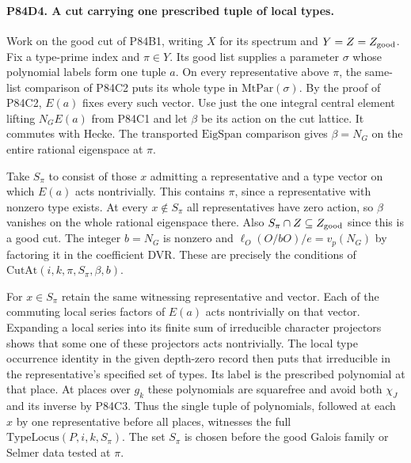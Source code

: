 \paragraph{P84D4. A cut carrying one prescribed tuple of local types.}
Work on the good cut of P84B1, writing $X$ for its spectrum
and $Y=Z=Z_{\rm good}$. Fix a type-prime index and $\pi\in Y$.
Its good list supplies a parameter $\sigma$ whose polynomial
labels form one tuple $a$. On every representative above $\pi$,
the same-list comparison of P84C2 puts its whole type in
$\mathrm{MtPar}(\sigma)$. By the proof of P84C2, $E(a)$ fixes
every such vector. Use just the one integral central element
lifting $N_G E(a)$ from P84C1 and let $\beta$ be its action
on the cut lattice. It commutes with Hecke. The transported
$\mathrm{EigSpan}$ comparison gives $\beta=N_G$ on the entire
rational eigenspace at $\pi$.

Take $S_\pi$ to consist of those $x$ admitting a representative
and a type vector on which $E(a)$ acts nontrivially. This
contains $\pi$, since a representative with nonzero type exists.
At every $x\notin S_\pi$ all representatives have zero action,
so $\beta$ vanishes on the whole rational eigenspace there.
Also $S_\pi\cap Z\subseteq Z_{\rm good}$ since this is a good
cut. The integer $b=N_G$ is nonzero and
$\ell_O(O/bO)/e=v_p(N_G)$ by factoring it in the coefficient
DVR. These are precisely the conditions of
$\mathrm{CutAt}(i,k,\pi,S_\pi,\beta,b)$.

For $x\in S_\pi$ retain the same witnessing representative
and vector. Each of the commuting local series factors of
$E(a)$ acts nontrivially on that vector. Expanding a local
series into its finite sum of irreducible character projectors
shows that some one of these projectors acts nontrivially.
The local type occurrence identity in the given depth-zero
record then puts that irreducible in the representative's
specified set of types. Its label is the prescribed polynomial
at that place. At places over $g_k$ these polynomials are
squarefree and avoid both $\chi_J$ and its inverse by P84C3.
Thus the single tuple of polynomials, followed at each $x$ by
one representative before all places, witnesses the full
$\mathrm{TypeLocus}(P,i,k,S_\pi)$. The set $S_\pi$ is chosen
before the good Galois family or Selmer data tested at $\pi$.

